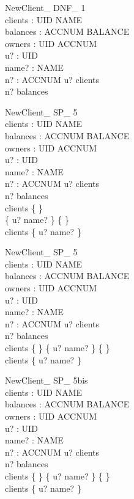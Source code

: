 \documentclass{article}
\begin{document}
\begin{schema}{NewClient\_ DNF\_ 1}\\
 clients : UID \pfun NAME \\
 balances : ACCNUM \pfun BALANCE \\
 owners : UID \rel ACCNUM \\
 u? : UID \\
 name? : NAME \\
 n? : ACCNUM 
\where
 u? \notin \dom clients \\
 n? \notin \dom balances
\end{schema}

\begin{schema}{NewClient\_ SP\_ 5}\\
 clients : UID \pfun NAME \\
 balances : ACCNUM \pfun BALANCE \\
 owners : UID \rel ACCNUM \\
 u? : UID \\
 name? : NAME \\
 n? : ACCNUM 
\where
 u? \notin \dom clients \\
 n? \notin \dom balances \\
 clients \neq \{ \} \\
 \{ u? \mapsto name? \} \neq \{ \} \\
 clients \subset \{ u? \mapsto name? \}
\end{schema}

\begin{schema}{NewClient\_ SP\_ 5}\\
 clients : UID \pfun NAME \\
 balances : ACCNUM \pfun BALANCE \\
 owners : UID \rel ACCNUM \\
 u? : UID \\
 name? : NAME \\
 n? : ACCNUM 
\where
 u? \notin \dom clients \\
 n? \notin \dom balances \\
 clients \neq \{ \} \land \{ u? \mapsto name? \} \neq \{ \} \\
 clients \subset \{ u? \mapsto name? \}
\end{schema}

\begin{schema}{NewClient\_ SP\_ 5bis}\\
 clients : UID \pfun NAME \\
 balances : ACCNUM \pfun BALANCE \\
 owners : UID \rel ACCNUM \\
 u? : UID \\
 name? : NAME \\
 n? : ACCNUM 
\where
 u? \notin \dom clients \\
 n? \notin \dom balances \\
 clients \neq \{ \} \land \{ u? \mapsto name? \} \neq \{ \} \\
 clients \subset \{ u? \mapsto name? \}
\end{schema}
\end{document}
